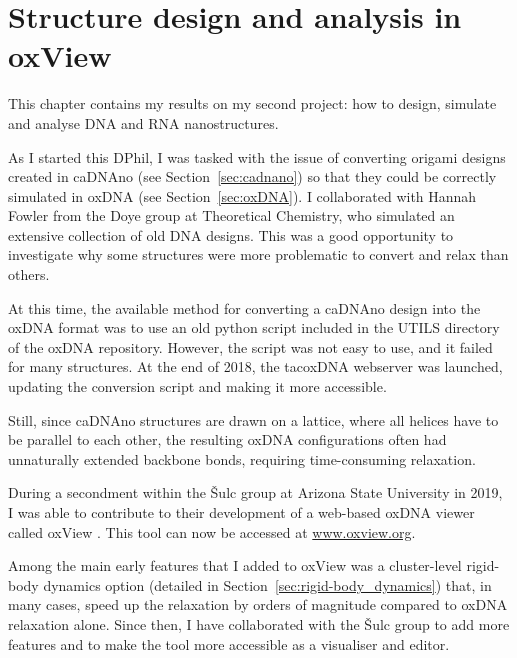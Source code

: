 \chapter{\label{ch:oxview}Structure design and analysis in oxView}

\minitoc

This chapter contains my results on my second project: how to design, simulate and analyse DNA and RNA nanostructures. 


As I started this DPhil, I was tasked with the issue of converting origami designs created in caDNAno (see Section~\ref{sec:cadnano}) so that they could be correctly simulated in oxDNA (see Section~\ref{sec:oxDNA}). I collaborated with Hannah Fowler from the Doye group at Theoretical Chemistry, who simulated an extensive collection of old DNA designs. This was a good opportunity to investigate why some structures were more problematic to convert and relax than others.

At this time, the available method for converting a caDNAno design into the oxDNA format was to use an old python script included in the UTILS directory of the oxDNA repository. However, the script was not easy to use, and it failed for many structures. At the end of 2018, the tacoxDNA webserver \cite{suma2019tacoxdna} was launched, updating the conversion script and making it more accessible.

Still, since caDNAno structures are drawn on a lattice, where all helices have to be parallel to each other, the resulting oxDNA configurations often had unnaturally extended backbone bonds, requiring time-consuming relaxation.

During a secondment within the {\v{S}}ulc group at Arizona State University in 2019, I was able to contribute to their development of a web-based oxDNA viewer called oxView \cite{poppleton2020design, bohlin2021design}. This tool can now be accessed at {\large\url{www.oxview.org}}.

Among the main early features that I added to oxView was a cluster-level rigid-body dynamics option (detailed in Section~\ref{sec:rigid-body_dynamics}) that, in many cases, speed up the relaxation by orders of magnitude compared to oxDNA relaxation alone. Since then, I have collaborated with the {\v{S}}ulc group to add more features and to make the tool more accessible as a visualiser and editor. 

